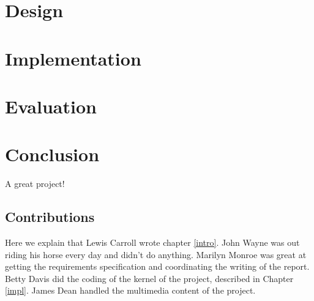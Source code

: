 \documentclass{l3proj}
\begin{document}



\chapter{Design}
\label{design}



\chapter{Implementation}
\label{implementation}



\chapter{Evaluation}
\label{evaluation}


\chapter{Conclusion}
\label{conclusion}

A great project!

\section{Contributions}
\label{contributions}

Here we explain that Lewis Carroll wrote chapter \ref{intro}. John Wayne
was out riding his horse every day and didn't do anything. Marilyn Monroe
was great at getting the requirements specification and coordinating the
writing of the report. Betty Davis did the coding of the kernel of the
project, described in Chapter \ref{impl}.  James Dean handled the
multimedia content of the project.



\end{document}
